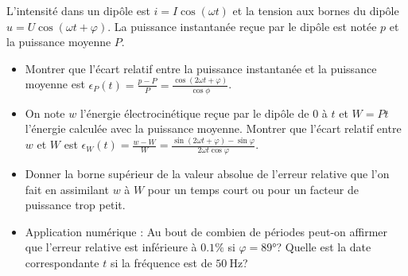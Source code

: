 \begin{exercice}%
  L'intensité dans un dipôle est \(i = I\cos(\omega t)\) et la tension aux 
  bornes du dipôle \(u=U\cos(\omega t +\varphi)\). La puissance instantanée 
  reçue par le dipôle est notée \(p\) et la puissance moyenne \(P\).
  \begin{itemize}
    \item Montrer que l'écart relatif entre la puissance instantanée et la 
      puissance moyenne est \(\epsilon_P(t) = \frac{p-P}{P} = 
      \frac{\cos(2\omega t +\varphi)}{\cos\phi}\).
    \item On note \(w\) l'énergie électrocinétique reçue par le dipôle de \(0\) 
      à \(t\) et \(W=Pt\) l'énergie calculée avec la puissance moyenne. Montrer 
      que l'écart relatif entre \(w\) et \(W\) est \(\epsilon_W(t) = 
      \frac{w-W}{W} = \frac{\sin(2\omega t + \varphi)-\sin\varphi}{2\omega t 
      \cos\varphi}\).
    \item Donner la borne supérieur de la valeur absolue de l'erreur relative 
      que l'on fait en assimilant \(w\) à \(W\) pour un temps court ou pour un 
      facteur de puissance trop petit.
    \item Application numérique : Au bout de combien de périodes peut-on 
      affirmer que l'erreur relative est inférieure à \(0.1\%\) si 
      \(\varphi=89°\)? Quelle est la date correspondante \(t\) si la fréquence 
      est de \(\SI{50}{\hertz}\)?
  \end{itemize}
\end{exercice}%
